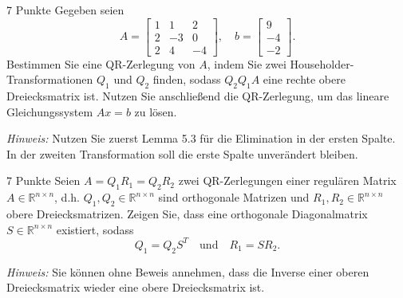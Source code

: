 \documentclass{problemset}
\author{Michael van Straten}
\begin{document}
\maketitle

\setcounter{problem}{2}

\begin{problem}{7 Punkte}
Gegeben seien
\[
    A =
    \begin{bmatrix}
        1 & 1  & 2  \\
        2 & -3 & 0  \\
        2 & 4  & -4
    \end{bmatrix}, \quad
    b =
    \begin{bmatrix}
        9  \\
        -4 \\
        -2
    \end{bmatrix}.
\]
Bestimmen Sie eine QR-Zerlegung von \( A \), indem Sie zwei
  Householder-Transformationen \( Q_1 \) und \( Q_2 \) finden, sodass \( Q_2
  Q_1 A \) eine rechte obere Dreiecksmatrix ist. Nutzen Sie anschließend die
  QR-Zerlegung, um das lineare Gleichungssystem \( Ax = b \) zu lösen.

\textit{Hinweis:} Nutzen Sie zuerst Lemma 5.3 für die Elimination in der ersten Spalte. In der zweiten Transformation soll die erste Spalte unverändert bleiben.
\end{problem}

\begin{problem}{7 Punkte}
Seien \( A = Q_1 R_1 = Q_2 R_2 \) zwei QR-Zerlegungen einer regulären Matrix \(
A \in \mathbb{R}^{n \times n} \), d.h. \( Q_1, Q_2 \in \mathbb{R}^{n \times n}
\) sind orthogonale Matrizen und \( R_1, R_2 \in \mathbb{R}^{n \times n} \)
obere Dreiecksmatrizen. Zeigen Sie, dass eine orthogonale Diagonalmatrix \( S
\in \mathbb{R}^{n \times n} \) existiert, sodass
\[
    Q_1 = Q_2 S^T \quad \text{und} \quad R_1 = S R_2.
\]

\textit{Hinweis:} Sie können ohne Beweis annehmen, dass die Inverse einer oberen Dreiecksmatrix wieder eine obere Dreiecksmatrix ist.
\end{problem}
\end{document}

